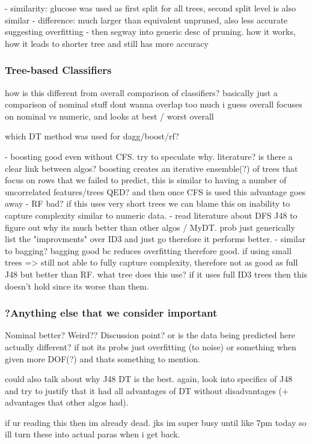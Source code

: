 


- similarity: glucose was used as first split for all trees, second split level is also similar
- difference: much larger than equivalent unpruned, also less accurate suggesting overfitting
- then segway into generic desc of pruning. how it works, how it leads to shorter tree and still has more accuracy



\subsubsection{Tree-based Classifiers}


how is this different from overall comparison of classifiers? basically just a comparison of nominal stuff
dont wanna overlap too much
i guess overall focuses on nominal vs numeric, and looks at best / worst overall

which DT method was used for dagg/boost/rf?


- boosting good even without CFS. try to speculate why. literature? is there a clear link between algos? boosting creates an iterative ensemble(?) of trees that focus on rows that we failed to predict, this is similar to having a number of uncorrelated features/trees QED? and then once CFS is used this advantage goes away
- RF bad? if this uses very short trees we can blame this on inability to capture complexity similar to numeric data.
- read literature about DFS J48 to figure out why its much better than other algos / MyDT. prob just generically list the "improvments" over ID3 and just go therefore it performs better.
- similar to bagging? bagging good bc reduces overfitting therefore good. if using small trees => still not able to fully capture complexity, therefore not as good as full J48 but better than RF. what tree does this use? if it uses full ID3 trees then this doesn't hold since its worse than them.


\subsubsection{?Anything else that we consider important}

Nominal better? Weird?? Discussion point?
or is the data being predicted here actually different? if not its probs just overfitting (to noise) or something when given more DOF(?) and thats something to mention.


could also talk about why J48 DT is the best. again, look into specifics of J48 and try to justify that it had all advantages of DT without disadvantages (+ advantages that other algos had).


if ur reading this then im already dead. jks im super busy until like 7pm today so ill turn these into actual paras when i get back.
